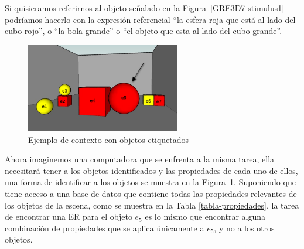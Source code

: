 %



Si quisieramos referirnos al objeto se\~nalado en la Figura~\ref{GRE3D7-stimulus1} podr\'iamos hacerlo con la expresi\'on referencial ``la
esfera roja que est\'a al lado del cubo rojo'', o ``la bola grande'' o ``el objeto que esta al lado del cubo grande''. 

\begin{figure}[ht]
\centering
\includegraphics[width=0.6\textwidth]{images/22.jpg}
\caption{Ejemplo de contexto con objetos etiquetados}
\label{GRE3D7-stimulus2}
\end{figure}

%


Ahora imaginemos una computadora que se enfrenta a la misma
tarea, ella necesitar\'a tener a los objetos identificados y las propiedades de cada uno de ellos, una forma de identificar a los objetos se muestra en la Figura~\ref{GRE3D7-stimulus2}. Suponiendo que tiene acceso a una base de datos que contiene todas
las propiedades relevantes de los objetos de la escena, como se muestra en la Tabla \ref{tabla-propiedades}, la tarea de encontrar una ER para el objeto $e_5$ es lo mismo que encontrar alguna combinaci\'on de propiedades que se aplica \'unicamente a $e_5$, y no a los otros objetos.\\


